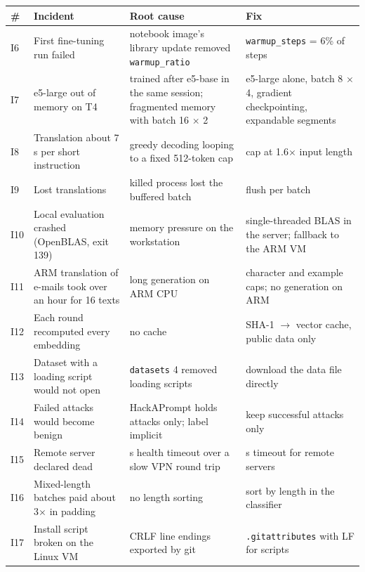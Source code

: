 \documentclass[11pt]{article}
\newcommand{\code}[1]{\texttt{#1}}
\begin{document}
\begin{center}
\small
\begin{tabularx}{\linewidth}{@{}l>{\raggedright\arraybackslash\hsize=0.90\hsize}X>{\raggedright\arraybackslash\hsize=1.08\hsize}X>{\raggedright\arraybackslash\hsize=1.02\hsize}X@{}}
\toprule
\# & Incident & Root cause & Fix \\
\midrule
I6 & First fine-tuning run failed & notebook image's library update removed \code{warmup\_ratio} & \code{warmup\_steps} = 6\% of steps %
 \\
I7 & e5-large out of memory on T4 & trained after e5-base in the same session; fragmented memory with batch 16 \ensuremath{\times} 2 & e5-large alone, batch 8 \ensuremath{\times} 4, gradient checkpointing, expandable segments %
 \\
I8 & Translation about 7 s per short instruction & greedy decoding looping to a fixed 512-token cap & cap at 1.6\ensuremath{\times} input length %
 \\
I9 & Lost translations & killed process lost the buffered batch & flush per batch %
 \\
I10 & Local evaluation crashed (OpenBLAS, exit 139) & memory pressure on the workstation & single-threaded BLAS in the server; fallback to the ARM VM %
 \\
I11 & ARM translation of e-mails took over an hour for 16 texts & long generation on ARM CPU & character and example caps; no generation on ARM %
 \\
I12 & Each round recomputed every embedding & no cache & SHA-1 \ensuremath{\rightarrow} vector cache, public data only %
 \\
I13 & Dataset with a loading script would not open & \code{datasets} 4 removed loading scripts & download the data file directly %
 \\
I14 & Failed attacks would become benign & HackAPrompt holds attacks only; label implicit & keep successful attacks only %
 \\
I15 & Remote server declared dead & 2 s health timeout over a slow VPN round trip & 10 s timeout for remote servers %
 \\
I16 & Mixed-length batches paid about 3\ensuremath{\times} in padding & no length sorting & sort by length in the classifier %
 \\
I17 & Install script broken on the Linux VM & CRLF line endings exported by git & \code{.\allowbreak{}gitattributes} with LF for scripts %
 \\
\bottomrule
\end{tabularx}
\end{center}
\end{document}
